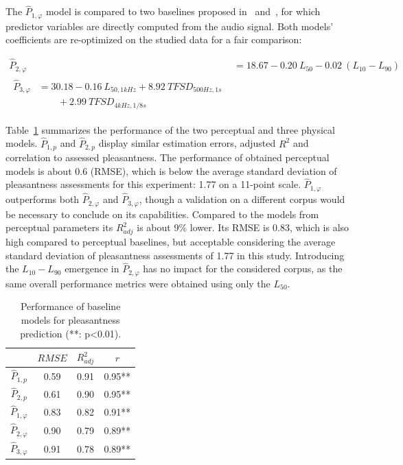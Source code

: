 \documentclass[twocolumn]{article}
\begin{document}
The $\hat P_{1, \varphi}$ model is compared to two baselines proposed in~\cite{ricciardi2014} and~\cite{aumond2017}, for which predictor variables are directly computed from the audio signal. Both models' coefficients are re-optimized on the studied data for a fair comparison:

\begin{align}
\hat P_{2, \varphi} &= 18.67 - 0.20~L_{50} - 0.02~(L_{10}-L_{90})\\
\begin{split}
\hat P_{3, \varphi} &= 30.18 - 0.16~L_{50, 1kHz} + 8.92~TFSD_{500Hz, 1s} \\
&\qquad + 2.99~TFSD_{4kHz, 1/8s}
\end{split}
\end{align}

Table~\ref{tab:pleasm} summarizes the performance of the two perceptual and three physical models. $\hat P_{1, p}$ and $\hat P_{2, p}$ display similar estimation errors, adjusted $R^2$ and correlation to assessed pleasantness. The performance of obtained perceptual models is about 0.6 (RMSE), which is below the average standard deviation of pleasantness assessments for this experiment: 1.77 on a 11-point scale. $\hat P_{1, \varphi}$ outperforms both $\hat P_{2, \varphi}$ and $\hat P_{3, \varphi}$, though a validation on a different corpus would be necessary to conclude on its capabilities. Compared to the models from perceptual parameters its $R^2_{adj}$ is about 9\% lower. Its RMSE is 0.83, which is also high compared to perceptual baselines, but acceptable considering the average standard deviation of pleasantness assessments of 1.77 in this study. Introducing the $L_{10}-L_{90}$ emergence in $\hat P_{2, \varphi}$ has no impact for the considered corpus, as the same overall performance metrics were obtained using only the $L_{50}$.

\begin{table}[h]
\centering
\caption{Performance of baseline models for pleasantness prediction (**: p<0.01).}
\label{tab:pleasm}
\begin{tabular}{ c | c | c | c }
\hline
	 & $RMSE$ & $R^2_{adj}$ & $r$ \\ \hline
	$\hat P_{1, p}$ & 0.59 & 0.91 & 0.95** \\
	$\hat P_{2, p}$ & 0.61 & 0.90 & 0.95** \\ \hline
	$\hat P_{1, \varphi}$ & 0.83 & 0.82 & 0.91** \\
	$\hat P_{2, \varphi}$ & 0.90 & 0.79 & 0.89** \\
	$\hat P_{3, \varphi}$ & 0.91 & 0.78 & 0.89** \\ \hline
\end{tabular}
\end{table}
\end{document}
